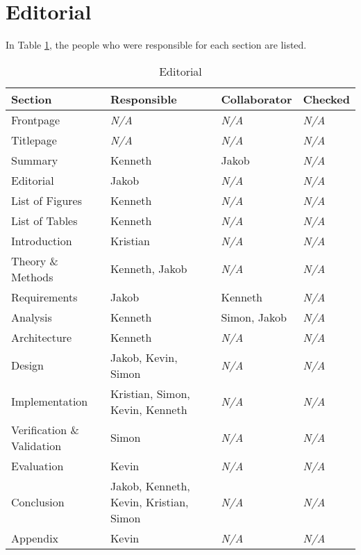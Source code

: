 \section{Editorial}
In Table \ref{table:editorial}, the people who were responsible for each section
are listed.
\begin{table}[ht]
    \begin{tabularx}{\textwidth}{|>{\RaggedRight}X|>{\RaggedRight}X|>{\RaggedRight}X|>{\RaggedRight}X|}
        \hline
        \textbf{Section} & \textbf{Responsible} & \textbf{Collaborator} & \textbf{Checked}\\
        \hline
        Frontpage & \textit{N/A} & \textit{N/A} & \textit{N/A}\\
        \hline
        Titlepage & \textit{N/A} & \textit{N/A} & \textit{N/A}\\
        \hline
        Summary & Kenneth & Jakob & \textit{N/A}\\
        \hline
        Editorial & Jakob & \textit{N/A} & \textit{N/A}\\
        \hline
        List of Figures & Kenneth & \textit{N/A} & \textit{N/A}\\
        \hline
        List of Tables & Kenneth & \textit{N/A} & \textit{N/A}\\
        \hline
        Introduction & Kristian & \textit{N/A} & \textit{N/A}\\
        \hline
        Theory \& Methods & Kenneth, Jakob & \textit{N/A} & \textit{N/A}\\
        \hline
        Requirements & Jakob & Kenneth & \textit{N/A}\\
        \hline
        Analysis & Kenneth & Simon, Jakob & \textit{N/A}\\
        \hline
        Architecture & Kenneth & \textit{N/A} & \textit{N/A}\\
        \hline
        Design & Jakob, Kevin, Simon & \textit{N/A} & \textit{N/A}\\
        \hline
        Implementation & Kristian, Simon, Kevin, Kenneth & \textit{N/A} & \textit{N/A}\\
        \hline
        Verification \& Validation & Simon & \textit{N/A} & \textit{N/A}\\
        \hline
        Evaluation & Kevin & \textit{N/A} & \textit{N/A}\\
        \hline
        Conclusion & Jakob, Kenneth, Kevin, Kristian, Simon & \textit{N/A} & \textit{N/A}\\
        \hline
        Appendix & Kevin & \textit{N/A} & \textit{N/A}\\
        \hline
    \end{tabularx}
    \caption{Editorial} 
    \label{table:editorial}
\end{table} 